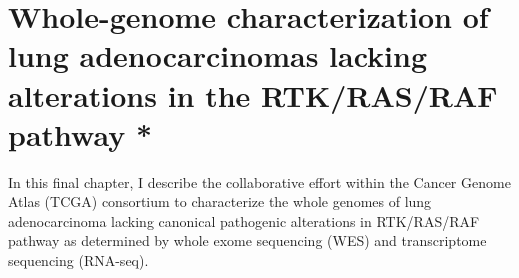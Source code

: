 \documentclass[phd,tocprelim]{cornell}
\begin{document}



\chapter{Whole-genome characterization of lung adenocarcinomas lacking alterations in the RTK/RAS/RAF pathway *} \label{chap:gdan}

In this final chapter, I describe the collaborative effort within the Cancer Genome Atlas (TCGA) consortium to characterize the whole genomes of lung adenocarcinoma lacking canonical pathogenic alterations in RTK/RAS/RAF pathway as determined by whole exome sequencing (WES) and transcriptome sequencing (RNA-seq).
\end{document}
